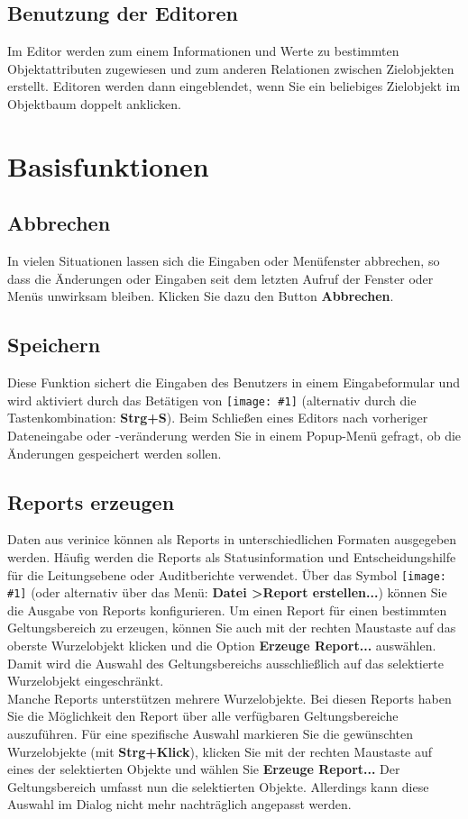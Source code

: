 \documentclass[a4paper,10pt]{book}
\newcommand{\icon}[1]{\texttt{[image: \#1]}}
\begin{document}
\section{Benutzung der Editoren}
Im Editor werden zum einem Informationen und Werte zu bestimmten Objektattributen zugewiesen und zum anderen Relationen zwischen Zielobjekten erstellt.
Editoren werden dann eingeblendet, wenn Sie ein beliebiges Zielobjekt im Objektbaum doppelt anklicken.

\chapter{Basisfunktionen}
\section{Abbrechen}
In vielen Situationen lassen sich die Eingaben oder Menüfenster abbrechen, so dass die Änderungen oder Eingaben seit dem
letzten Aufruf der Fenster oder Menüs unwirksam bleiben. Klicken Sie dazu den Button \textbf{Abbrechen}.

\section{Speichern}
Diese Funktion sichert die Eingaben des Benutzers in einem Eingabeformular und wird aktiviert durch das Betätigen von \icon{Icon/Disk.png}
(alternativ durch die Tastenkombination: \textbf{Strg+S}). Beim Schließen eines
Editors nach vorheriger Dateneingabe oder \mbox{-veränderung} werden Sie in einem Popup-Menü gefragt, ob die Änderungen gespeichert werden sollen.

\section{Reports erzeugen} \label{Reports erzeugen}
Daten aus verinice können als Reports in unterschiedlichen Formaten ausgegeben werden. Häufig werden die Reports als
Statusinformation und Entscheidungshilfe für die Leitungsebene oder Auditberichte verwendet. Über das Symbol \icon{Icon/Report.png}
(oder alternativ über das Menü: \textbf{Datei \textgreater  Report erstellen...}) können Sie die Ausgabe von Reports konfigurieren. Um einen Report
für einen bestimmten Geltungsbereich zu erzeugen, können Sie auch mit der rechten Maustaste auf das oberste Wurzelobjekt
klicken und die Option \textbf{Erzeuge Report...} auswählen. Damit wird die Auswahl des Geltungsbereichs ausschließlich auf das selektierte Wurzelobjekt
eingeschränkt.\\ Manche Reports unterstützen mehrere Wurzelobjekte. Bei diesen
Reports haben Sie die Möglichkeit den Report über alle verfügbaren
Geltungsbereiche auszuführen. Für eine spezifische Auswahl markieren Sie die
gewünschten Wurzelobjekte (mit \textbf{Strg+Klick}), klicken Sie mit der rechten
Maustaste auf eines der selektierten Objekte und wählen Sie \textbf{Erzeuge
Report...} Der Geltungsbereich umfasst nun die selektierten Objekte.
Allerdings kann diese Auswahl im Dialog nicht mehr nachträglich angepasst
werden.\\
\end{document}
